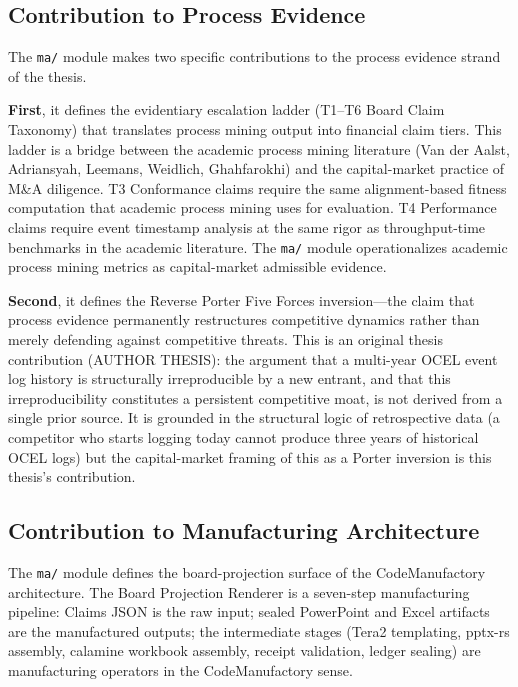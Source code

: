 \subsection{Contribution to Process Evidence}
\label{sec:ma-contrib-process-evidence}

The \texttt{ma/} module makes two specific contributions to the process evidence strand of
the thesis.

\textbf{First}, it defines the evidentiary escalation ladder (T1--T6 Board Claim Taxonomy)
that translates process mining output into financial claim tiers. This ladder is a bridge
between the academic process mining literature (Van der Aalst, Adriansyah, Leemans, Weidlich,
Ghahfarokhi) and the capital-market practice of M\&A diligence. T3 Conformance claims require
the same alignment-based fitness computation that academic process mining uses for evaluation.
T4 Performance claims require event timestamp analysis at the same rigor as throughput-time
benchmarks in the academic literature. The \texttt{ma/} module operationalizes academic
process mining metrics as capital-market admissible evidence.

\textbf{Second}, it defines the Reverse Porter Five Forces inversion---the claim that process
evidence permanently restructures competitive dynamics rather than merely defending against
competitive threats. This is an original thesis contribution (AUTHOR THESIS): the argument
that a multi-year OCEL event log history is structurally irreproducible by a new entrant, and
that this irreproducibility constitutes a persistent competitive moat, is not derived from a
single prior source. It is grounded in the structural logic of retrospective data (a competitor
who starts logging today cannot produce three years of historical OCEL logs) but the
capital-market framing of this as a Porter inversion is this thesis's contribution.

\subsection{Contribution to Manufacturing Architecture}
\label{sec:ma-contrib-manufacturing}

The \texttt{ma/} module defines the board-projection surface of the CodeManufactory
architecture. The Board Projection Renderer is a seven-step manufacturing pipeline: Claims
JSON is the raw input; sealed PowerPoint and Excel artifacts are the manufactured outputs;
the intermediate stages (Tera2 templating, pptx-rs assembly, calamine workbook assembly,
receipt validation, ledger sealing) are manufacturing operators in the CodeManufactory sense.

